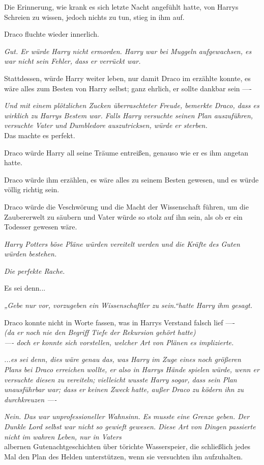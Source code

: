 {Die Erinnerung, wie krank es sich letzte Nacht angefühlt hatte, von Harrys Schreien zu wissen, jedoch nichts zu tun, stieg in ihm auf.

Draco fluchte wieder innerlich.

\emph{Gut. Er würde Harry nicht ermorden. Harry war bei Muggeln aufgewachsen, es war nicht sein Fehler, dass er verrückt war.}

Stattdessen, würde Harry weiter leben, nur damit Draco im erzählte konnte, es wäre alles zum Besten von Harry selbst; ganz ehrlich, er sollte dankbar sein ----

\emph{Und mit einem plötzlichen Zucken überraschteter Freude, bemerkte Draco, dass es wirklich zu Harrys Bestem war. Falls Harry versuchte seinen Plan auszuführen, versuchte Vater und Dumbledore auszutricksen, würde er sterben.}\\ Das machte es perfekt.

Draco würde Harry all seine Träume entreißen, genauso wie er es ihm angetan hatte.

Draco würde ihm erzählen, es wäre alles zu seinem Besten gewesen, und es würde völlig richtig sein.

Draco würde die Veschwörung und die Macht der Wissenschaft führen, um die Zaubererwelt zu säubern und Vater würde so stolz auf ihn sein, als ob er ein Todesser gewesen wäre.

\emph{Harry Potters böse Pläne würden vereitelt werden und die Kräfte des Guten würden bestehen.}

\emph{Die perfekte Rache.}

Es sei denn...

\emph{„Gebe nur vor, vorzugeben ein Wissenschaftler zu sein.“hatte Harry ihm gesagt.}

Draco konnte nicht in Worte fassen, was in Harrys Verstand falsch lief ----\\ \emph{(da er noch nie den Begriff Tiefe der Rekursion gehört hatte)}\\ \emph{---- doch er konnte sich vorstellen, welcher Art von Plänen es implizierte.}

\emph{...es sei denn, dies wäre genau das, was Harry im Zuge eines noch größeren Plans bei Draco erreichen wollte, er also in Harrys Hände spielen würde, wenn er versuchte diesen zu vereiteln; vielleicht wusste Harry sogar, dass sein Plan unausführbar war; dass er keinen Zweck hatte, außer Draco zu ködern ihn zu durchkreuzen ----}

\emph{Nein. Das war unprofessioneller Wahnsinn. Es musste eine Grenze geben. Der Dunkle Lord selbst war nicht so gewieft gewesen. Diese Art von Dingen passierte nicht im wahren Leben, nur in Vaters}\\ albernen Gutenachtgeschichten über törichte Wasserspeier, die schließlich jedes Mal den Plan des Helden unterstützen, wenn sie versuchten ihn aufzuhalten.

}
